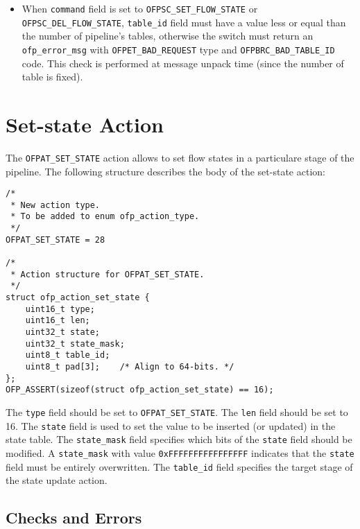 \begin{itemize}
    \item When \texttt{command} field is set to \texttt{OFPSC\_SET\_FLOW\_STATE} or \texttt{OFPSC\_DEL\_FLOW\_STATE}, \texttt{table\_id} field must have a value less or equal than the number of pipeline’s tables, otherwise the switch must return an \texttt{ofp\_error\_msg} with \texttt{OFPET\_BAD\_REQUEST} type and \texttt{OFPBRC\_BAD\_TABLE\_ID} code. This check is performed at message unpack time (since the number of table is fixed).

\end{itemize}

\section{Set-state Action}
\label{sec:act_set_state_proto}

The \texttt{OFPAT\_SET\_STATE} action allows to set flow states in a particulare stage of the pipeline. The following structure describes the body of the set-state action:

\begin{verbatim}
/*
 * New action type.
 * To be added to enum ofp_action_type.
 */
OFPAT_SET_STATE = 28 

/*
 * Action structure for OFPAT_SET_STATE.
 */
struct ofp_action_set_state {
    uint16_t type;
    uint16_t len;
    uint32_t state;
    uint32_t state_mask;
    uint8_t table_id;
    uint8_t pad[3];    /* Align to 64-bits. */
};
OFP_ASSERT(sizeof(struct ofp_action_set_state) == 16);
\end{verbatim}


The \texttt{type} field should be set to \texttt{OFPAT\_SET\_STATE}. The \texttt{len} field should be set to 16.
The \texttt{state} field is used to set the value to be inserted (or updated) in the state table.
The \texttt{state\_mask} field specifies which bits of the \texttt{state} field should be modified. A \texttt{state\_mask} with value \texttt{0xFFFFFFFFFFFFFFFF} indicates that the \texttt{state} field must be entirely overwritten. The \texttt{table\_id} field specifies the target stage of the state update action.

\subsection{Checks and Errors}

